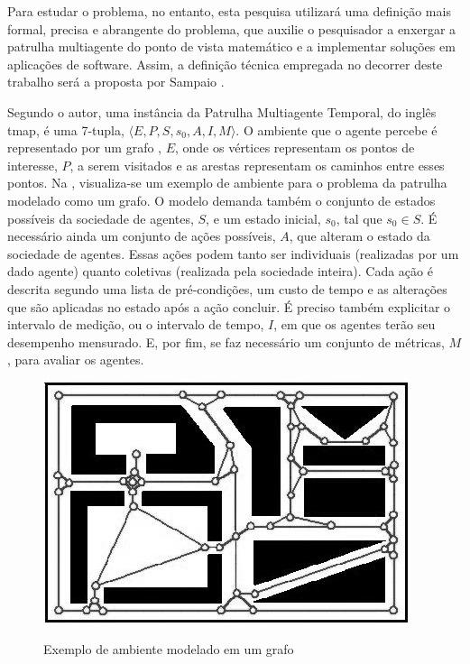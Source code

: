 Para estudar o problema, no entanto, esta pesquisa utilizará uma definição mais 
formal, precisa e abrangente do problema, que auxilie o pesquisador a enxergar 
a patrulha multiagente do ponto de vista matemático e a implementar soluções em 
aplicações de software. Assim, a definição técnica empregada no decorrer deste 
trabalho será a proposta por Sampaio \citep{sampaiophd}.

Segundo o autor, uma instância da Patrulha Multiagente Temporal, do inglês 
\ac{tmap}, é uma 7-tupla, $ \langle E, P, S, s_{0}, A, I, M \rangle $. O 
ambiente que o agente percebe é representado por um grafo 
\citep{Rosen:2002:DMA:579402}, $E$, onde os vértices representam os pontos de 
interesse, $P$, a serem visitados e as arestas representam os caminhos entre 
esses pontos. Na , visualiza-se um exemplo de ambiente 
para o problema da patrulha modelado como um grafo. O modelo demanda também o 
conjunto de estados possíveis da sociedade de agentes, $S$, e um estado inicial, 
$ s_{0} $, tal que $ s_{0} \in S $. É necessário ainda um conjunto de ações 
possíveis, $A$, que alteram o estado da sociedade de agentes. Essas ações podem 
tanto ser individuais (realizadas por um dado agente) quanto coletivas 
(realizada pela sociedade inteira). Cada ação é descrita segundo uma lista de 
pré-condições, um custo de tempo e as alterações que são aplicadas no estado 
após a ação concluir. É preciso também explicitar o intervalo de medição, ou o 
intervalo de tempo, $I$, em que os agentes terão seu desempenho mensurado. E, 
por fim, se faz necessário um conjunto de métricas, $M$, para avaliar os 
agentes.

\begin{figure}[tp]
	\caption[Exemplo de ambiente modelado em um grafo]{Exemplo de ambiente 
		modelado em um grafo \citep{sampaiophd}}
	\centering
	\includegraphics[width=0.75\columnwidth]{images/grafoExemplo.png}
	\label{fig:graphexample}
\end{figure}

